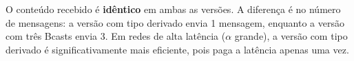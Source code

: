 \documentclass[12pt,a4paper]{article}
\begin{document}
O conteúdo recebido é \textbf{idêntico} em ambas as versões. A diferença é no
número de mensagens: a versão com tipo derivado envia 1 mensagem, enquanto a
versão com três Bcasts envia 3. Em redes de alta latência ($\alpha$ grande),
a versão com tipo derivado é significativamente mais eficiente, pois paga a
latência apenas uma vez.
\end{document}
